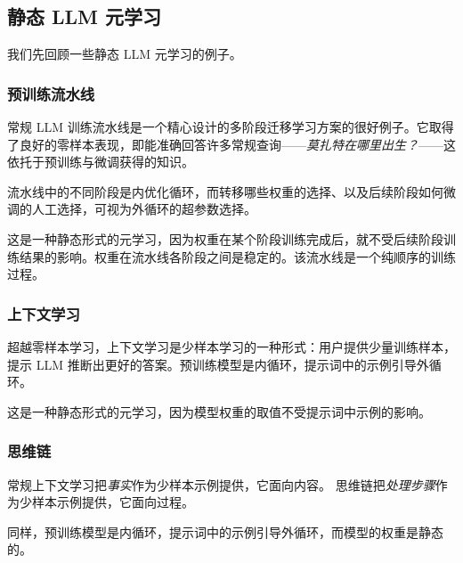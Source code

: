 \subsection{静态 LLM 元学习}
我们先回顾一些静态 LLM 元学习的例子。

\subsubsection{预训练流水线}
常规 LLM 训练流水线是一个精心设计的多阶段迁移学习方案的很好例子。它取得了良好的零样本表现，即能准确回答许多常规查询——{\em 莫扎特在哪里出生？}——这依托于预训练与微调获得的知识。

流水线中的不同阶段是内优化循环，而转移哪些权重的选择、以及后续阶段如何微调的人工选择，可视为外循环的超参数选择。

这是一种静态形式的元学习，因为权重在某个阶段训练完成后，就不受后续阶段训练结果的影响。权重在流水线各阶段之间是稳定的。该流水线是一个纯顺序的训练过程。

\subsubsection{上下文学习}
超越零样本学习，上下文学习是少样本学习的一种形式：用户提供少量训练样本，提示 LLM 推断出更好的答案。预训练模型是内循环，提示词中的示例引导外循环。

这是一种静态形式的元学习，因为模型权重的取值不受提示词中示例的影响。



\subsubsection{思维链}
常规上下文学习把{\em 事实}作为少样本示例提供，它面向内容。
思维链把{\em 处理步骤}作为少样本示例提供，它面向过程。


同样，预训练模型是内循环，提示词中的示例引导外循环，而模型的权重是静态的。


